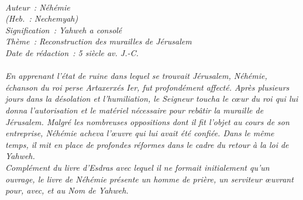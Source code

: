 \BFont
\noindent\hrulefill
{\footnotesize
\textit{
\bigskip
{\centering{}
\\Auteur~: Néhémie
\\(Heb.~: Nechemyah)
\\Signification~: Yahweh a consolé
\\Thème~: Reconstruction des murailles de Jérusalem
\\Date de rédaction~: 5 siècle av. J.-C.\\}
}
\textit{
\\En apprenant l'état de ruine dans lequel se trouvait Jérusalem, Néhémie, échanson du roi perse Artaxerxés Ier, fut profondément affecté. Après plusieurs jours dans la désolation et l'humiliation, le Seigneur toucha le cœur du roi qui lui donna l'autorisation et le matériel nécessaire pour rebâtir la muraille de Jérusalem. Malgré les nombreuses oppositions dont il fit l'objet au cours de son entreprise, Néhémie acheva l'œuvre qui lui avait été confiée. Dans le même temps, il mit en place de profondes réformes dans le cadre du retour à la loi de Yahweh.
\\Complément du livre d'Esdras avec lequel il ne formait initialement qu'un ouvrage, le livre de Néhémie présente un homme de prière, un serviteur œuvrant pour, avec, et au Nom de Yahweh.\bigskip
}
}
\par\nobreak\noindent\hrulefill
